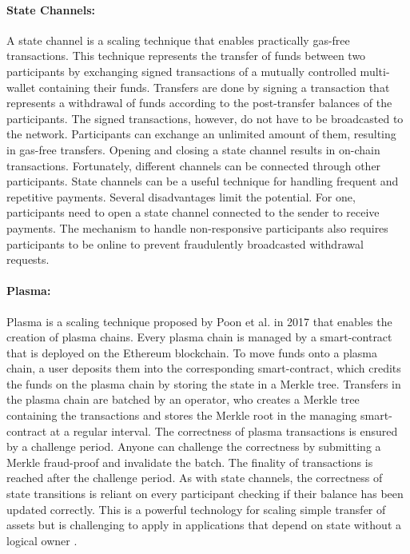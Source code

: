 \documentclass[../../thesis.tex]{subfiles}
\begin{document}
\paragraph{State Channels:}
A state channel \cite{coleman2015state} is a scaling technique that enables practically gas-free transactions. This technique represents the transfer of funds between two participants by exchanging signed transactions of a mutually controlled multi-wallet containing their funds. Transfers are done by signing a transaction that represents a withdrawal of funds according to the post-transfer balances of the participants. The signed transactions, however, do not have to be broadcasted to the network. Participants can exchange an unlimited amount of them, resulting in gas-free transfers. Opening and closing a state channel results in on-chain transactions. Fortunately, different channels can be connected through other participants. State channels can be a useful technique for handling frequent and repetitive payments. Several disadvantages limit the potential. For one, participants need to open a state channel connected to the sender to receive payments. The mechanism to handle non-responsive participants also requires participants to be online to prevent fraudulently broadcasted withdrawal requests.

\paragraph{Plasma:}
Plasma is a scaling technique proposed by Poon et al. \cite{poon2017plasma} in 2017 that enables the creation of plasma chains. Every plasma chain is managed by a smart-contract that is deployed on the Ethereum blockchain. To move funds onto a plasma chain, a user deposits them into the corresponding smart-contract, which credits the funds on the plasma chain by storing the state in a Merkle tree. Transfers in the plasma chain are batched by an operator, who creates a Merkle tree containing the transactions and stores the Merkle root in the managing smart-contract at a regular interval. The correctness of plasma transactions is ensured by a challenge period. Anyone can challenge the correctness by submitting a Merkle fraud-proof and invalidate the batch. The finality of transactions is reached after the challenge period. As with state channels, the correctness of state transitions is reliant on every participant checking if their balance has been updated correctly. This is a powerful technology for scaling simple transfer of assets but is challenging to apply in applications that depend on state without a logical owner \cite{vitalik2020rollup}.
\end{document}
